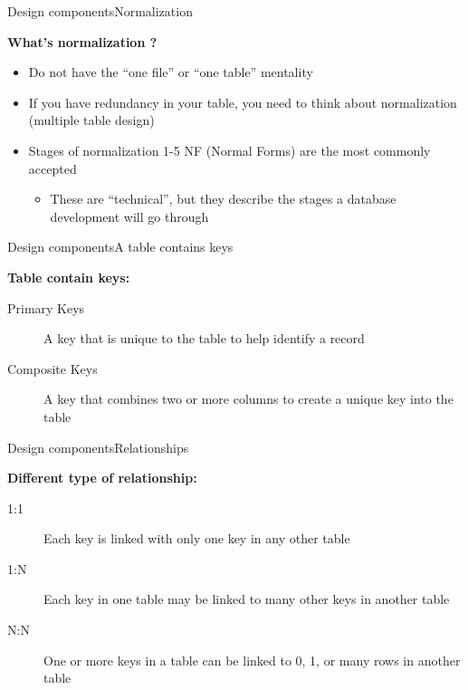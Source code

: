 \documentclass[table]{eecslides}
\begin{document}
\begin{frame}{Design components}{Normalization}

\textbf{What's normalization ?}

		\begin{itemize}
			\item Do not have the “one file” or “one table” mentality
			\item If you have redundancy in your table, you need to think about normalization (multiple table design)
			\item Stages of normalization 1-5 NF (Normal Forms) are the most commonly accepted
			\begin{itemize}
				\item These are “technical”, but they describe the stages a database development will go through
			\end{itemize}
		\end{itemize}

\end{frame}


\begin{frame}{Design components}{A table contains keys}

\alert{\textbf{Table contain keys:}}
		 \begin{description}
			 \item [Primary Keys] A key that is unique to the table to help identify a record
			\item [Composite Keys] A key that combines two or more columns to create a unique key into the table
		\end{description}

\end{frame}


\begin{frame}{Design components}{Relationships}

\textbf{Different type of relationship:}

		\begin{description}
			\item [1:1] Each key is linked with only one key in any other table
			\item [1:N] Each key in one table may be linked to many other keys in another table
			\item [N:N] One or more keys in a table can be linked to 0, 1, or many rows in another table
		\end{description}

\end{frame}
\end{document}
